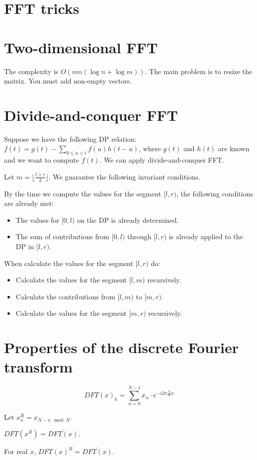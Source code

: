 \section*{FFT tricks}
\section*{Two-dimensional FFT}
The complexity is $O(nm(\log n + \log m))$.
The main problem is to resize the matrix. You must add non-empty vectors.

\section*{Divide-and-conquer FFT}
Suppose we have the following DP relation: $f(t) = g(t) - \sum_{0 \le u < t} f(u) h(t-u)$,
where $g(t)$ and $h(t)$ are known and we want to compute $f(t)$. We can apply divide-and-conquer FFT.

Let $m = \lfloor\frac{l+r}{2}\rfloor$. We guarantee the following invariant conditions.

By the time we compute the values for the segment $[l,r)$, the following conditions are already met:
\begin{itemize}
\item The values for $[0,l)$ on the DP is already determined.
\item The sum of contributions from $[0,l)$ through $[l,r)$ is already applied to the DP in $[l,r)$.
\end{itemize}

When calculate the values for the segment $[l, r)$ do:
\begin{itemize}
\item Calculate the values for the segment $[l,m)$ recursively.
\item Calculate the contributions from $[l,m)$ to $[m,r)$.
\item Calculate the values for the segment $[m,r)$ recursively.
\end{itemize}

\section*{Properties of the discrete Fourier transform}

$$DFT(x)_k = \sum_{n = 0}^{N - 1} x_n \cdot e^{-i 2 \pi \frac{k}{N}n}$$

Let $x^R_n = x_{N - n \mod N}$.

$DFT(x^R) = \overline{DFT(x)}.$

For real $x$, $DFT(x)^R = \overline{DFT(x)}$.
